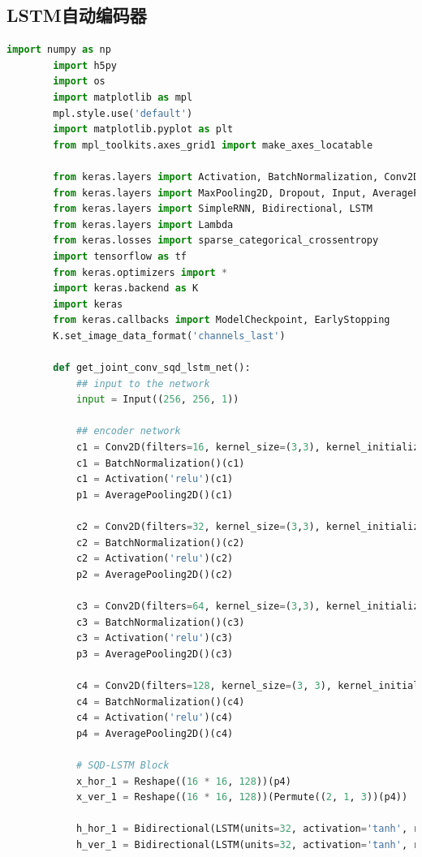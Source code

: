 \documentclass[a4paper]{article}
\begin{document}
	\subsection{LSTM自动编码器}
	\begin{lstlisting}[language=python,columns=fullflexible,frame=shadowbox]
		import numpy as np
		import h5py
		import os
		import matplotlib as mpl
		mpl.style.use('default')
		import matplotlib.pyplot as plt
		from mpl_toolkits.axes_grid1 import make_axes_locatable
		
		from keras.layers import Activation, BatchNormalization, Conv2D, UpSampling2D, Conv2DTranspose, concatenate
		from keras.layers import MaxPooling2D, Dropout, Input, AveragePooling2D, Reshape, Permute, UpSampling2D
		from keras.layers import SimpleRNN, Bidirectional, LSTM
		from keras.layers import Lambda
		from keras.losses import sparse_categorical_crossentropy
		import tensorflow as tf
		from keras.optimizers import *
		import keras.backend as K
		import keras
		from keras.callbacks import ModelCheckpoint, EarlyStopping
		K.set_image_data_format('channels_last')

		def get_joint_conv_sqd_lstm_net():
			## input to the network
			input = Input((256, 256, 1))
		
			## encoder network
			c1 = Conv2D(filters=16, kernel_size=(3,3), kernel_initializer='he_normal', padding='same')(input)
			c1 = BatchNormalization()(c1)
			c1 = Activation('relu')(c1)
			p1 = AveragePooling2D()(c1)
		
			c2 = Conv2D(filters=32, kernel_size=(3,3), kernel_initializer='he_normal', padding='same')(p1)
			c2 = BatchNormalization()(c2)
			c2 = Activation('relu')(c2)
			p2 = AveragePooling2D()(c2)
		
			c3 = Conv2D(filters=64, kernel_size=(3,3), kernel_initializer='he_normal', padding='same')(p2)
			c3 = BatchNormalization()(c3)
			c3 = Activation('relu')(c3)
			p3 = AveragePooling2D()(c3)
		
			c4 = Conv2D(filters=128, kernel_size=(3, 3), kernel_initializer='he_normal', padding='same')(p3)
			c4 = BatchNormalization()(c4)
			c4 = Activation('relu')(c4)
			p4 = AveragePooling2D()(c4)
		
			# SQD-LSTM Block
			x_hor_1 = Reshape((16 * 16, 128))(p4)
			x_ver_1 = Reshape((16 * 16, 128))(Permute((2, 1, 3))(p4))
		
			h_hor_1 = Bidirectional(LSTM(units=32, activation='tanh', return_sequences=True, go_backwards=False))(x_hor_1)
			h_ver_1 = Bidirectional(LSTM(units=32, activation='tanh', return_sequences=True, go_backwards=False))(x_ver_1)
		

\end{lstlisting}
\end{document}
